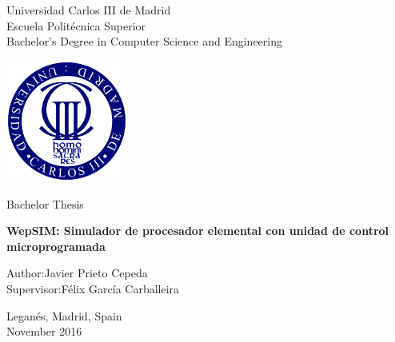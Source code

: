 \documentclass[11pt,twoside]{mitthesis}
\begin{document}

\begin{titlepage}
    \begin{center}
        \vspace*{1cm}
     
        \Large
        Universidad Carlos III de Madrid\\
        Escuela Politécnica Superior\\
        Bachelor's Degree in Computer Science and Engineering
        
        \vspace{0.8cm}
        
        \centering        
        \includegraphics[width=0.3\textwidth]{figures/uc3m}
        
        \vspace{1.5cm}
        
        \LARGE
        Bachelor Thesis
        
        \Huge
        \textbf{WepSIM: Simulador de procesador elemental con unidad de control microprogramada}
        
        \vspace{0.5cm}
        
        \vspace{1.5cm}
        
        \Large
        \begin{changemargin}{3.8cm}{3.8cm}
        Author:\hfill Javier Prieto Cepeda\\
        Supervisor:\hfill Félix García Carballeira\\
        \end{changemargin}
		\begin{changemargin}{3.8cm}{3.8cm}
		\begin{flushright}		        
        \vspace{0.5cm}
        Leganés, Madrid, Spain\\
        November 2016
 		\end{flushright}
        \end{changemargin}
        
        \vfill
        
    \end{center}
\end{titlepage}
\end{document}
